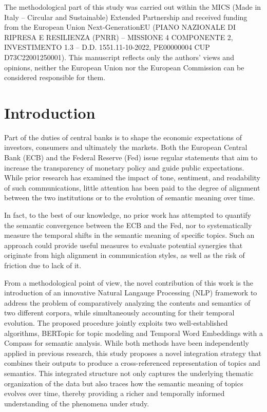 
\begin{acknowledgements}
The methodological part of this study was carried out within the MICS (Made in Italy -- Circular and Sustainable) Extended Partnership and received funding from the European Union Next-GenerationEU (PIANO NAZIONALE DI RIPRESA E RESILIENZA (PNRR) -- MISSIONE 4 COMPONENTE 2, INVESTIMENTO 1.3 -- D.D. 1551.11-10-2022, PE00000004 CUP D73C22001250001). This manuscript reflects only the authors’ views and opinions, neither the European Union nor the European Commission can be considered responsible for them.
\end{acknowledgements}

\section{Introduction}\label{sec1}

Part of the duties of central banks is to shape the economic expectations of investors, consumers and ultimately the markets. Both the European Central Bank (ECB) and the Federal Reserve (Fed) issue regular statements that aim to increase the transparency of monetary policy and guide public expectations. While prior research has examined the impact of tone, sentiment, and readability of such communications, little attention has been paid to the degree of alignment between the two institutions or to the evolution of semantic meaning over time.

In fact, to the best of our knowledge, no prior work has attempted to quantify the semantic convergence between the ECB and the Fed, nor to systematically measure the temporal shifts in the semantic meaning of specific topics. Such an approach could provide useful measures to evaluate potential synergies that originate from high alignment in communication styles, as well as the risk of friction due to lack of it. 

From a methodological point of view, the novel contribution of this work is the introduction of an innovative Natural Langauge Processing (NLP) framework to address the problem of comparatively analyzing the contents and semantics of two different corpora, while simultaneously accounting for their temporal evolution. The proposed procedure jointly exploits two well-established algorithms, BERTopic for topic modeling and Temporal Word Embeddings with a Compass for semantic analysis. While both methods have been independently applied in previous research, this study proposes a novel integration strategy that combines their outputs to produce a cross-referenced representation of topics and semantics. This integrated structure not only captures the underlying thematic organization of the data but also traces how the semantic meaning of topics evolves over time, thereby providing a richer and temporally informed understanding of the phenomena under study.

